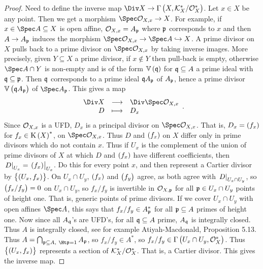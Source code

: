 
\begin{proof}
Need to define the inverse map $ \Div X \to \Gamma\br{X, \KKK_X^* / \OOO_X^*} $. Let $ x \in X $ be any point. Then we get a morphism $ \Spec \OOO_{X, x} \to X $. For example, if $ x \in \Spec A \subseteq X $ is open affine, $ \mathcal{O}_{X, x} = A_{\mathfrak{p}} $ where $ \mathfrak{p} $ corresponds to $ x $ and then $ A \to A_{\mathfrak{p}} $ induces the morphism $ \Spec \OOO_{X, x} \to \Spec A \hookrightarrow X $. A prime divisor on $ X $ pulls back to a prime divisor on $ \Spec \OOO_{X, x} $ by taking inverse images. More precisely, given $ Y \subseteq X $ a prime divisor, if $ x \notin Y $ then pull-back is empty, otherwise $ \Spec A \cap Y $ is non-empty and is of the form $ \VV\br{\qqq} $ for $ \mathfrak{q} \subseteq A $ a prime ideal with $ \mathfrak{q} \subseteq \mathfrak{p} $. Then $ \mathfrak{q} $ corresponds to a prime ideal $ \mathfrak{q} A_{\mathfrak{p}} $ of $ A_{\mathfrak{p}} $, hence a prime divisor $ \VV\br{\qqq A_\ppp} $ of $ \Spec A_\ppp $. This gives a map
$$ \function{\Div X}{\Div \Spec \OOO_{X, x}}{D}{D_x}. $$
Since $ \mathcal{O}_{X, x} $ is a UFD, $ D_x $ is a principal divisor on $ \Spec \OOO_{X, x} $. That is, $ D_x = \br{f_x} $ for $ f_x \in \K\br{X}^* $, on $ \Spec \OOO_{X, x} $. Thus $ D $ and $ \br{f_x} $ on $ X $ differ only in prime divisors which do not contain $ x $. Thus if $ U_x $ is the complement of the union of prime divisors of $ X $ at which $ D $ and $ \br{f_x} $ have different coefficients, then $ \eval{D}_{U_x} = \eval{\br{f_x}}_{U_x} $. Do this for every point $ x $, and then represent a Cartier divisor by $ \cbr{\br{U_x, f_x}} $. On $ U_x \cap U_y $, $ \br{f_x} $ and $ \br{f_y} $ agree, as both agree with $ \left. D \right|_{U_x \cap U_y} $, so $ \br{f_x / f_y} = 0 $ on $ U_x \cap U_y $, so $ f_x / f_y $ is invertible in $ \mathcal{O}_{X, \mathfrak{p}} $ for all $ \mathfrak{p} \in U_x \cap U_y $ points of height one. That is, generic points of prime divisors. If we cover $ U_x \cap U_y $ with open affines $ \Spec A $, this says that $ f_x / f_y \in A_{\mathfrak{p}}^* $ for all $ \mathfrak{p} \subseteq A $ primes of height one. Now since all $ A_{\mathfrak{q}} $'s are UFD's, for all $ \mathfrak{q} \subseteq A $ prime, $ A_{\mathfrak{q}} $ is integrally closed. Thus $ A $ is integrally closed, see for example Atiyah-Macdonald, Proposition 5.13. Thus $ A = \bigcap_{\ppp \subseteq A, \ \Ht \ppp = 1} A_\ppp $, so $ f_x / f_y \in A^* $, so $ f_x / f_y \in \Gamma\br{U_x \cap U_y, \OOO_X^*} $. Thus $ \cbr{\br{U_x, f_x}} $ represents a section of $ \mathcal{K}_X^* / \mathcal{O}_X^* $. That is, a Cartier divisor. This gives the inverse map.
\end{proof}

